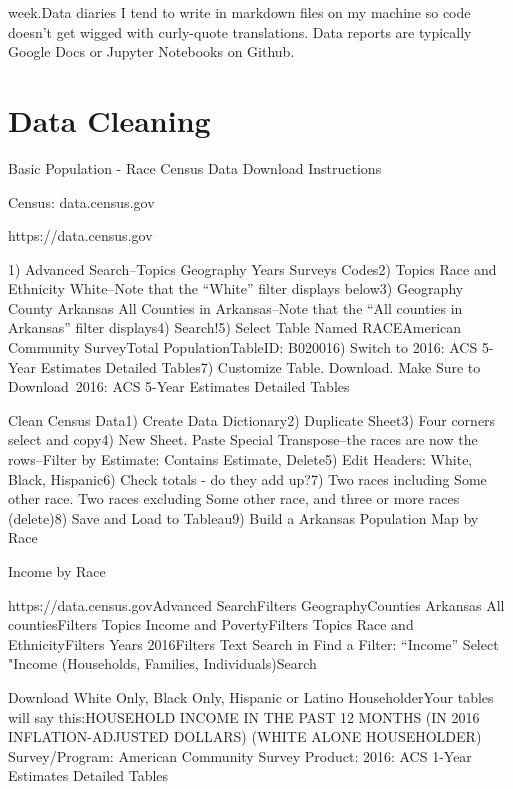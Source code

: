 \documentclass[]{book}
\begin{document}
week.Data diaries I tend to write in markdown files on my machine so code doesn't get wigged with curly-quote translations. Data reports are typically Google Docs or Jupyter Notebooks on Github.

\hypertarget{data-cleaning}{%
\chapter{Data Cleaning}\label{data-cleaning}}

Basic Population - Race Census Data Download Instructions

Census: data.census.gov

https://data.census.gov

1) Advanced Search--Topics \textbar{} Geography \textbar{} Years \textbar{} Surveys \textbar{} Codes2) Topics \textbar{} Race and Ethnicity \textbar{} White--Note that the ``White'' filter displays below3) Geography \textbar{} County \textbar{} Arkansas \textbar{} All Counties in Arkansas--Note that the ``All counties in Arkansas'' filter displays4) Search!5) Select Table Named RACEAmerican Community SurveyTotal PopulationTableID: B020016) Switch to 2016: ACS 5-Year Estimates Detailed Tables7) Customize Table. Download. Make Sure to Download~2016: ACS 5-Year Estimates Detailed Tables

Clean Census Data1) Create Data Dictionary2) Duplicate Sheet3) Four corners select and copy4) New Sheet. Paste Special \textbar{} Transpose--the races are now the rows--Filter by Estimate: Contains Estimate, Delete5) Edit Headers: White, Black, Hispanic6) Check totals - do they add up?7) Two races including Some other race. Two races excluding Some other race, and three or more races (delete)8) Save and Load to Tableau9) Build a Arkansas Population Map by Race

Income by Race

https://data.census.govAdvanced SearchFilters \textbar{} GeographyCounties \textbar{} Arkansas \textbar{} All countiesFilters \textbar{} Topics \textbar{} Income and PovertyFilters \textbar{} Topics \textbar{} Race and EthnicityFilters \textbar{} Years \textbar{} 2016Filters \textbar{} Text Search in Find a Filter: ``Income'' \textbar{} Select "Income (Households, Families, Individuals)Search

Download White Only, Black Only, Hispanic or Latino HouseholderYour tables will say this:HOUSEHOLD INCOME IN THE PAST 12 MONTHS (IN 2016 INFLATION-ADJUSTED DOLLARS) (WHITE ALONE HOUSEHOLDER) Survey/Program: American Community Survey Product: 2016: ACS 1-Year Estimates Detailed Tables
\end{document}
